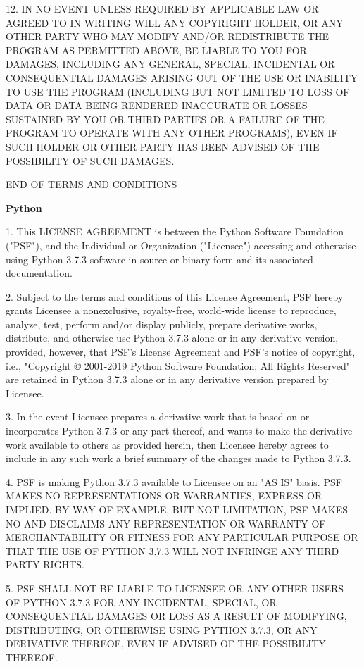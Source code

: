 12. IN NO EVENT UNLESS REQUIRED BY APPLICABLE LAW OR AGREED TO IN WRITING
WILL ANY COPYRIGHT HOLDER, OR ANY OTHER PARTY WHO MAY MODIFY AND/OR
REDISTRIBUTE THE PROGRAM AS PERMITTED ABOVE, BE LIABLE TO YOU FOR DAMAGES,
INCLUDING ANY GENERAL, SPECIAL, INCIDENTAL OR CONSEQUENTIAL DAMAGES ARISING
OUT OF THE USE OR INABILITY TO USE THE PROGRAM (INCLUDING BUT NOT LIMITED
TO LOSS OF DATA OR DATA BEING RENDERED INACCURATE OR LOSSES SUSTAINED BY
YOU OR THIRD PARTIES OR A FAILURE OF THE PROGRAM TO OPERATE WITH ANY OTHER
PROGRAMS), EVEN IF SUCH HOLDER OR OTHER PARTY HAS BEEN ADVISED OF THE
POSSIBILITY OF SUCH DAMAGES.

END OF TERMS AND CONDITIONS

\textbf{Python}

1. This LICENSE AGREEMENT is between the Python Software Foundation ("PSF"), and
the Individual or Organization ("Licensee") accessing and otherwise using Python
3.7.3 software in source or binary form and its associated documentation.

2. Subject to the terms and conditions of this License Agreement, PSF hereby
grants Licensee a nonexclusive, royalty-free, world-wide license to reproduce,
analyze, test, perform and/or display publicly, prepare derivative works,
distribute, and otherwise use Python 3.7.3 alone or in any derivative
version, provided, however, that PSF's License Agreement and PSF's notice of
copyright, i.e., "Copyright © 2001-2019 Python Software Foundation; All Rights
Reserved" are retained in Python 3.7.3 alone or in any derivative version
prepared by Licensee.

3. In the event Licensee prepares a derivative work that is based on or
incorporates Python 3.7.3 or any part thereof, and wants to make the
derivative work available to others as provided herein, then Licensee hereby
agrees to include in any such work a brief summary of the changes made to Python
3.7.3.

4. PSF is making Python 3.7.3 available to Licensee on an "AS IS" basis.
PSF MAKES NO REPRESENTATIONS OR WARRANTIES, EXPRESS OR IMPLIED.  BY WAY OF
EXAMPLE, BUT NOT LIMITATION, PSF MAKES NO AND DISCLAIMS ANY REPRESENTATION OR
WARRANTY OF MERCHANTABILITY OR FITNESS FOR ANY PARTICULAR PURPOSE OR THAT THE
USE OF PYTHON 3.7.3 WILL NOT INFRINGE ANY THIRD PARTY RIGHTS.

5. PSF SHALL NOT BE LIABLE TO LICENSEE OR ANY OTHER USERS OF PYTHON 3.7.3
FOR ANY INCIDENTAL, SPECIAL, OR CONSEQUENTIAL DAMAGES OR LOSS AS A RESULT OF
MODIFYING, DISTRIBUTING, OR OTHERWISE USING PYTHON 3.7.3, OR ANY DERIVATIVE
THEREOF, EVEN IF ADVISED OF THE POSSIBILITY THEREOF.

